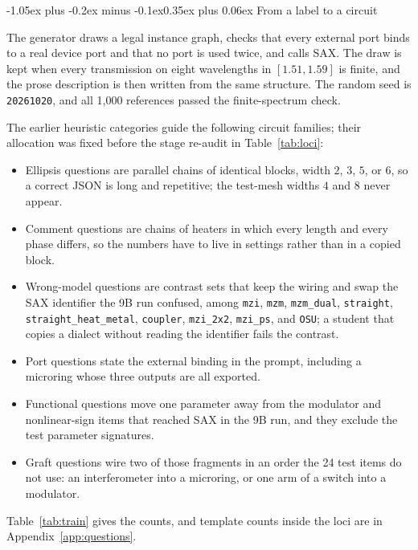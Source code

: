 \documentclass[11pt]{article}
\makeatletter
\renewcommand\subsection{\@startsection{subsection}{2}{\z@}%
  {-1.05ex plus -0.2ex minus -0.1ex}{0.35ex plus 0.06ex}%
  {\normalfont\normalsize\bfseries}}
\makeatother
\begin{document}
\subsection{From a label to a circuit}

The generator draws a legal instance graph, checks that every external port binds to a real device port and that no port is used twice, and calls SAX.
The draw is kept when every transmission on eight wavelengths in $[1.51, 1.59]$ is finite, and the prose description is then written from the same structure.
The random seed is \texttt{20261020}, and all 1{,}000 references passed the finite-spectrum check.

The earlier heuristic categories guide the following circuit families; their allocation was fixed before the stage re-audit in Table~\ref{tab:loci}:
\begin{itemize}
\item Ellipsis questions are parallel chains of identical blocks, width $2$, $3$, $5$, or $6$, so a correct JSON is long and repetitive; the test-mesh widths $4$ and $8$ never appear.
\item Comment questions are chains of heaters in which every length and every phase differs, so the numbers have to live in settings rather than in a copied block.
\item Wrong-model questions are contrast sets that keep the wiring and swap the SAX identifier the 9B run confused, among \texttt{mzi}, \texttt{mzm}, \texttt{mzm\_dual}, \texttt{straight}, \texttt{straight\_heat\_metal}, \texttt{coupler}, \texttt{mzi\_2x2}, \texttt{mzi\_ps}, and \texttt{OSU}; a student that copies a dialect without reading the identifier fails the contrast.
\item Port questions state the external binding in the prompt, including a microring whose three outputs are all exported.
\item Functional questions move one parameter away from the modulator and nonlinear-sign items that reached SAX in the 9B run, and they exclude the test parameter signatures.
\item Graft questions wire two of those fragments in an order the 24 test items do not use: an interferometer into a microring, or one arm of a switch into a modulator.
\end{itemize}
Table~\ref{tab:train} gives the counts, and template counts inside the loci are in Appendix~\ref{app:questions}.
\end{document}
